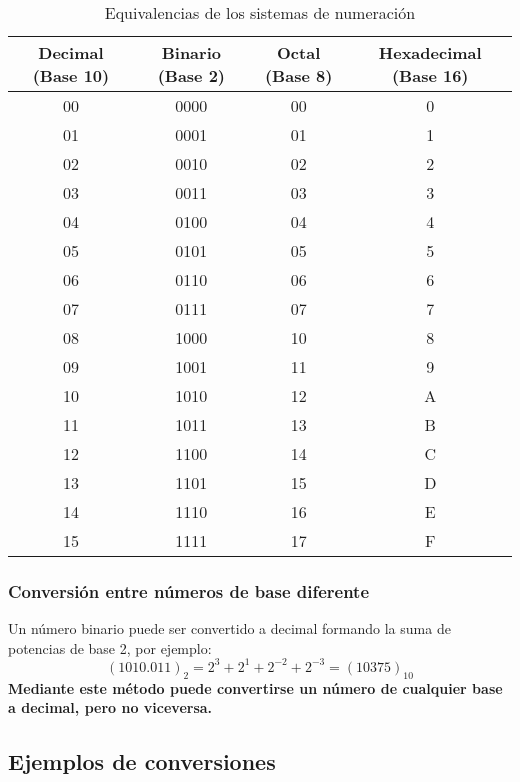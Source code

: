   \begin{table}[ht]
	\centering	
	\begin{tabular}{c c c c}
	  \toprule
	  \textbf{Decimal (Base 10)} & \textbf{Binario (Base 2)} & \textbf{Octal (Base 8)} & \textbf{Hexadecimal (Base 16)} \\
	  \midrule
	  00 & 0000 & 00 & 0\\
	  01 & 0001 & 01 & 1\\
	  02 & 0010 & 02 & 2\\
	  03 & 0011 & 03 & 3\\
	  04 & 0100 & 04 & 4\\
	  05 & 0101 & 05 & 5\\
	  06 & 0110 & 06 & 6\\
	  07 & 0111 & 07 & 7\\
	  08 & 1000 & 10 & 8\\
	  09 & 1001 & 11 & 9\\
	  10 & 1010 & 12 & A\\
	  11 & 1011 & 13 & B\\
	  12 & 1100 & 14 & C\\
	  13 & 1101 & 15 & D\\
	  14 & 1110 & 16 & E\\
	  15 & 1111 & 17 & F\\
	\bottomrule
    \end{tabular}
    \caption{Equivalencias de los sistemas de numeración}
    \label{table:sistemasNumeracion}
  \end{table}   
  
\subsubsection{Conversión entre números de base diferente}

Un número binario puede ser convertido a decimal formando la suma de potencias de base 2, por ejemplo:
$$(1010.011)_{2} = 2^{3} + 2^{1} + 2^{-2} + 2^{-3} = (10375)_{10}$$
\textbf{Mediante este método puede convertirse un número de cualquier base a decimal, pero no viceversa.}

\subsection{Ejemplos de conversiones}


